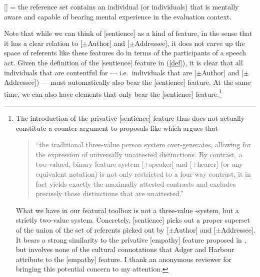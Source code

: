 \documentclass[output=paper, modfonts, nonflat]{langsci/langscibook}
\begin{document}
\ex \textsc{[\sentience]} = the reference set contains an individual (or
individuals) that is mentally aware and capable of bearing mental
experience in the evaluation context.  \z \z


\noindent Note that while we can think of [sentience] as a kind of \person{}
feature, in the sense that it has a clear relation to [$\pm$Author]
and [$\pm$Addressee], it does not carve up the space of referents like
these features do in terms of the participants of a speech
act. Given the definition of the [sentience] feature in (\ref{def}),
it is clear that all individuals that are contentful for \person{} ---
i.e.\ individuals that are [$\pm$Author] and [$\pm$Addressee]) ---
must automatically also bear the [sentience] feature. At the same
time, we can also have elements that only bear the [sentience]
feature.\footnote{The introduction of the privative [sentience]
  feature thus does not actually constitute a counter-argument to
  proposals like \citet[4]{bobaljik:2008a} which argues that \begin{quotation}``the
  traditional three-value person system over-generates, allowing for
  the expression of universally unattested distinctions. By contrast,
  a two-valued, binary feature system [$\pm$speaker] and [$\pm$hearer]
  (or any equivalent notation) is not only restricted to a four-way
  contrast, it in fact yields exactly the maximally attested contrasts
  and excludes precisely those distinctions that are unattested.''\end{quotation} What we have in our featural toolbox is not a three-value
  \person-system, but a strictly two-value \person{}
  system. Concretely, [sentience] picks out a proper superset of the
  union of the set of referents picked out by [$\pm$Author] and
  [$\pm$Addressee].  It bears a strong similarity to the privative
  [empathy] feature proposed in \citet{adgerharbour:2007}, but
  involves none of the cultural connotations that Adger and Harbour
  attribute to the [empathy] feature. I thank an anonymous reviewer
  for bringing this potential concern to my attention.} %
\end{document}
